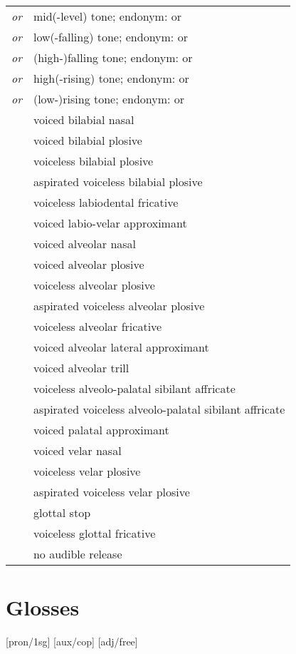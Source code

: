 \documentclass{article}
\begin{document}
\begin{xltabular}{\textwidth}{lL}
   \textit{or} \ipa{\={}} & mid(-level) tone; endonym:  or  \\
   \textit{or} \ipa{\`{}} & low(-falling) tone; endonym:  or  \\
   \textit{or} \ipa{\^{}} & (high-)falling tone; endonym:  or  \\
   \textit{or} \ipa{\'{}} & high(-rising) tone; endonym:  or  \\
   \textit{or} \ipa{\v{}} & (low-)rising tone; endonym:  or  \\
   & voiced bilabial nasal \\
   & voiced bilabial plosive \\
   & voiceless bilabial plosive \\
   & aspirated voiceless bilabial plosive \\
   & voiceless labiodental fricative \\
   & voiced labio-velar approximant \\
   & voiced alveolar nasal \\
   & voiced alveolar plosive \\
   & voiceless alveolar plosive \\
   & aspirated voiceless alveolar plosive \\
   & voiceless alveolar fricative \\
   & voiced alveolar lateral approximant \\
   & voiced alveolar trill \\
  \ipa{\texttctclig} & voiceless alveolo-palatal sibilant affricate \\
   & aspirated voiceless alveolo-palatal sibilant affricate\\
   & voiced palatal approximant \\
   & voiced velar nasal \\
   & voiceless velar plosive \\
   & aspirated voiceless velar plosive \\
   & glottal stop \\
   & voiceless glottal fricative \\
  \ipa{\textcorner} & no audible release \\
\end{xltabular}

\newpage\section{Glosses}

\ex[lingstyle=custom_nlevel]
\begingl
{}[pron/{\sc 1sg}]
[aux/{\sc cop}]
[adj/free]
\endgl
\xe
\end{document}
